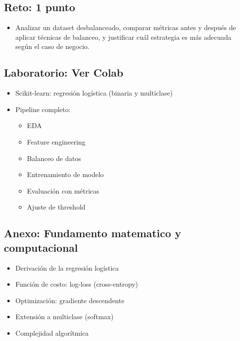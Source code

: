 \documentclass[12pt,a4paper,openany,oneside]{book}
\begin{document}
\begin{itemize}
\subsection{Reto: 1 punto}
\begin{itemize}
    \item Analizar un dataset desbalanceado, comparar métricas antes y después de aplicar técnicas de balanceo, y justificar cuál estrategia es más adecuada según el caso de negocio.
\end{itemize}

\subsection{Laboratorio: Ver Colab}
\begin{itemize}
    \item Scikit-learn: regresión logística (binaria y multiclase)
    \item Pipeline completo:
    \begin{itemize}
        \item EDA
        \item Feature engineering
        \item Balanceo de datos
        \item Entrenamiento de modelo
        \item Evaluación con métricas
        \item Ajuste de threshold
    \end{itemize}
\end{itemize}

\subsection{Anexo: Fundamento matematico y computacional}
\begin{itemize}
    \item Derivación de la regresión logística
    \item Función de costo: log-loss (cross-entropy)
    \item Optimización: gradiente descendente
    \item Extensión a multiclase (softmax)
    \item Complejidad algorítmica
\end{itemize}


\end{itemize}
\end{document}

